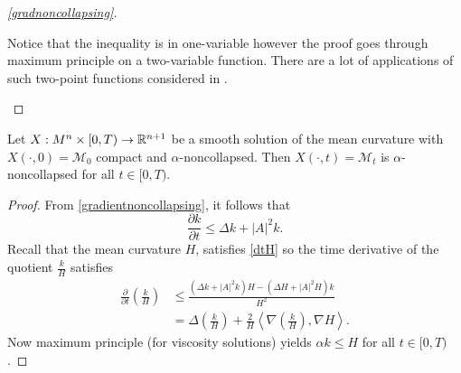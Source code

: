 \begin{proof}[\cref{gradnoncollapsing}]
    
    \begin{remark}
        Notice that the inequality is in one-variable however the proof goes through maximum principle on a two-variable function. There are a lot of applications of such two-point functions considered in \cite{brendle2014two,andrews2014moduli}.
    \end{remark}

















\end{proof}
\begin{corollary}
    [Noncollapsing]
    Let $ X: M^{n} \times [0,T) \to \mathbb{R}^{n+1} $ be a smooth solution of the mean curvature with $ X(\cdot, 0) = \mathcal{M}_{0} $ compact and $ \alpha $-noncollapsed. Then $ X(\cdot,t) = \mathcal{M}_{t} $ is $ \alpha $-noncollapsed for all $t \in [0,T)  $. 
\end{corollary}
\begin{proof}
    From \cref{gradientnoncollapsing}, it follows that 
    \[ \frac{\partial k}{ \partial t} \le \Delta k + |A|^{2}k.\]
    Recall that the mean curvature $ H $, satisfies \cref{dtH} so the time derivative of the quotient $ \frac{k}{H} $ satisfies \begin{align*}
        \frac{\partial }{\partial t}\left( \frac{k}{H} \right)  & \le \frac{(\Delta k+|A|^{2}k)H - (\Delta H + |A|^{2}H)k}{H^{2}} \\
        & = \Delta \left( \frac{k}{H} \right) + \frac{2}{H}\left< \nabla \left( \frac{k}{H} \right), \nabla H \right>.
    \end{align*}
    Now maximum principle (for viscosity solutions) yields $ \alpha k \le H  $ for all $ t \in [0,T) $. 
  

    
\end{proof}